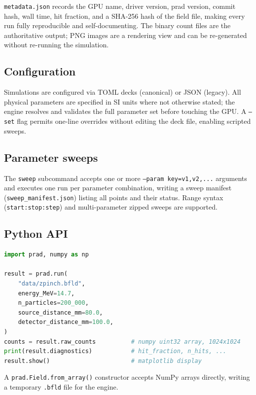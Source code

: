 \documentclass[review,12pt]{elsarticle}
\begin{document}
\texttt{metadata.json} records the GPU name, driver version, prad version, commit hash,
wall time, hit fraction, and a SHA-256 hash of the field file, making every run
fully reproducible and self-documenting. The binary count files are the authoritative
output; PNG images are a rendering view and can be re-generated without re-running the
simulation.

\subsection{Configuration}

Simulations are configured via TOML decks (canonical) or JSON (legacy). All physical
parameters are specified in SI units where not otherwise stated; the engine resolves
and validates the full parameter set before touching the GPU. A \texttt{--set} flag
permits one-line overrides without editing the deck file, enabling scripted sweeps.

\subsection{Parameter sweeps}

The \texttt{sweep} subcommand accepts one or more \texttt{--param key=v1,v2,...} arguments
and executes one run per parameter combination, writing a sweep manifest
(\texttt{sweep\_manifest.json}) listing all points and their status. Range syntax
(\texttt{start:stop:step}) and multi-parameter zipped sweeps are supported.

\subsection{Python API}

\begin{lstlisting}[language=Python]
import prad, numpy as np

result = prad.run(
    "data/zpinch.bfld",
    energy_MeV=14.7,
    n_particles=200_000,
    source_distance_mm=80.0,
    detector_distance_mm=100.0,
)
counts = result.raw_counts          # numpy uint32 array, 1024x1024
print(result.diagnostics)           # hit_fraction, n_hits, ...
result.show()                       # matplotlib display
\end{lstlisting}

A \texttt{prad.Field.from\_array()} constructor accepts NumPy arrays directly,
writing a temporary \texttt{.bfld} file for the engine.

\end{document}
